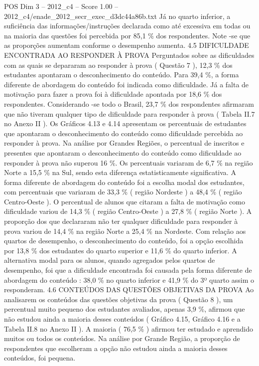 \begin{textsample}{POS Dim 3 – 2012\_c4 – Score 1.00 – 2012\_c4/enade\_2012\_secr\_exec\_d3dc44a86b.txt}
Já no quarto inferior, a suficiência das informações/instruções declarada como até excessiva em todas ou na maioria das questões foi percebida por 85,1 \% dos respondentes.
Note -se que as proporções aumentam conforme o desempenho aumenta. 4.5 DIFICULDADE ENCONTRADA AO RESPONDER À PROVA Perguntados sobre as dificuldades com as quais se depararam ao responder à prova ( Questão 7 ), 12,3 \% dos estudantes apontaram o desconhecimento do conteúdo.
Para 39,4 \%, a forma diferente de abordagem do conteúdo foi indicada como dificuldade.
Já a falta de motivação para fazer a prova foi à dificuldade apontada por 18,6 \% dos respondentes.
Considerando -se todo o Brasil, 23,7 \% dos respondentes afirmaram que não tiveram qualquer tipo de dificuldade para responder à prova ( Tabela II.7 no Anexo II ).
Os Gráficos 4.13 e 4.14 apresentam os percentuais de estudantes que apontaram o desconhecimento do conteúdo como dificuldade percebida ao responder à prova.
Na análise por Grandes Regiões, o percentual de inscritos e presentes que apontaram o desconhecimento do conteúdo como dificuldade ao responder à prova não superou 16 \%.
Os percentuais variaram de 6,7 \% na região Norte a 15,5 \% na Sul, sendo esta diferença estatisticamente significativa.
A forma diferente de abordagem do conteúdo foi a escolha modal dos estudantes, com percentuais que variaram de 33,3 \% ( região Nordeste ) a 48,4 \% ( região Centro-Oeste ).
O percentual de alunos que citaram a falta de motivação como dificuldade variou de 14,3 \% ( região Centro-Oeste ) a 27,8 \% ( região Norte ).
A proporção dos que declararam não ter qualquer dificuldade para responder à prova variou de 14,4 \% na região Norte a 25,4 \% na Nordeste.
Com relação aos quartos de desempenho, o desconhecimento do conteúdo, foi a opção escolhida por 13,8 \% dos estudantes do quarto superior e 11,6 \% do quarto inferior.
A alternativa modal para os alunos, quando agregados pelos quartos de desempenho, foi que a dificuldade encontrada foi causada pela forma diferente de abordagem do conteúdo : 38,0 \% no quarto inferior e 41,9 \% do 3º quarto assim o responderam. 4.6 CONTEÚDOS DAS QUESTÕES OBJETIVAS DA PROVA Ao analisarem os conteúdos das questões objetivas da prova ( Questão 8 ), um percentual muito pequeno dos estudantes avaliados, apenas 3,9 \%, afirmou que não estudou ainda a maioria desses conteúdos ( Gráfico 4.15, Gráfico 4.16 e a Tabela II.8 no Anexo II ).
A maioria ( 76,5 \% ) afirmou ter estudado e aprendido muitos ou todos os conteúdos.
Na análise por Grande Região, a proporção de respondentes que escolheram a opção não estudou ainda a maioria desses conteúdos, foi pequena.

\end{textsample}
